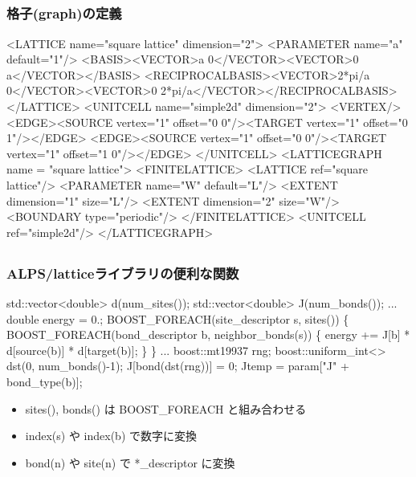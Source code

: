 \subsection*{\redm\whitem\greenb}
\begin{frame}[fragile,shrink=30]
  \frametitle{格子(graph)の定義}
\begin{semiverbatim}
<LATTICE name="square lattice" dimension="2">
  <PARAMETER name="a" default="1"/>
  <BASIS><VECTOR>a 0</VECTOR><VECTOR>0 a</VECTOR></BASIS>
  <RECIPROCALBASIS><VECTOR>2*pi/a 0</VECTOR><VECTOR>0 2*pi/a</VECTOR></RECIPROCALBASIS>
</LATTICE>
<UNITCELL name="simple2d" dimension="2">
  <VERTEX/>
  <EDGE><SOURCE vertex="1" offset="0 0"/><TARGET vertex="1" offset="0 1"/></EDGE>
  <EDGE><SOURCE vertex="1" offset="0 0"/><TARGET vertex="1" offset="1 0"/></EDGE>
</UNITCELL>
<LATTICEGRAPH name = "square lattice">
  <FINITELATTICE>
    <LATTICE ref="square lattice"/>
    <PARAMETER name="W" default="L"/>
    <EXTENT dimension="1" size="L"/>
    <EXTENT dimension="2" size="W"/>
    <BOUNDARY type="periodic"/>
  </FINITELATTICE>
  <UNITCELL ref="simple2d"/>
</LATTICEGRAPH>
\end{semiverbatim}
\end{frame}

\subsection*{\redm\whitem\greenb}
\begin{frame}[fragile,shrink=10]
  \frametitle{ALPS/latticeライブラリの便利な関数}
\begin{semiverbatim}
std::vector<double> d(\alert{num_sites()});
std::vector<double> J(\alert{num_bonds()});
...
double energy = 0.;
BOOST\_FOREACH(site_descriptor s, \alert{sites()}) \{
  BOOST\_FOREACH(bond_descriptor b, \alert{neighbor_bonds(s)}) \{
    energy += J[b] * d[\alert{source(b)}] * d[\alert{target(b)}];
  \}
\}
...
boost::mt19937 rng;
boost::uniform_int<> dst(0, \alert{num_bonds()}-1);
J[\alert{bond(dst(rng))}] = 0;
Jtemp = param["J" + \alert{bond_type(b)}];
\end{semiverbatim}
  \begin{itemize}
  \item sites(), bonds() は BOOST\_FOREACH と組み合わせる
  \item index(s) や index(b) で数字に変換
  \item bond(n) や site(n) で *\_descriptor に変換
  \end{itemize}
\end{frame}

